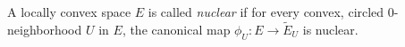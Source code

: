 A locally convex space $E$ is called \emph{nuclear} if for every convex, circled $0$-neighborhood $U$ in $E$, the canonical map $\phi_U: E \to \tilde{E}_U$ is nuclear.
